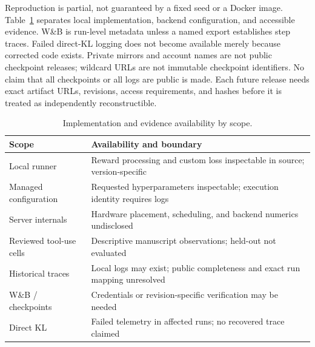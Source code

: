 Reproduction is partial, not guaranteed by a fixed seed or a Docker image.
Table~\ref{tab:availability-audit} separates local implementation, backend
configuration, and accessible evidence. W\&B is run-level metadata unless a
named export establishes step traces. Failed direct-KL logging does not become
available merely because corrected code exists. Private mirrors and account
names are not public checkpoint releases; wildcard URLs are not immutable
checkpoint identifiers. No claim that all checkpoints or all logs are public
is made. Each future release needs exact artifact URLs, revisions, access
requirements, and hashes before it is treated as independently reconstructible.

\begin{table}[htbp]
\centering\small
\caption{Implementation and evidence availability by scope.}
\label{tab:availability-audit}
\begin{tabular}{p{.28\linewidth}p{.62\linewidth}}
\toprule
Scope & Availability and boundary \\
\midrule
Local runner & Reward processing and custom loss inspectable in source; version-specific \\
Managed configuration & Requested hyperparameters inspectable; execution identity requires logs \\
Server internals & Hardware placement, scheduling, and backend numerics undisclosed \\
Reviewed tool-use cells & Descriptive manuscript observations; held-out not evaluated \\
Historical traces & Local logs may exist; public completeness and exact run mapping unresolved \\
W\&B / checkpoints & Credentials or revision-specific verification may be needed \\
Direct KL & Failed telemetry in affected runs; no recovered trace claimed \\
\bottomrule
\end{tabular}
\end{table}




